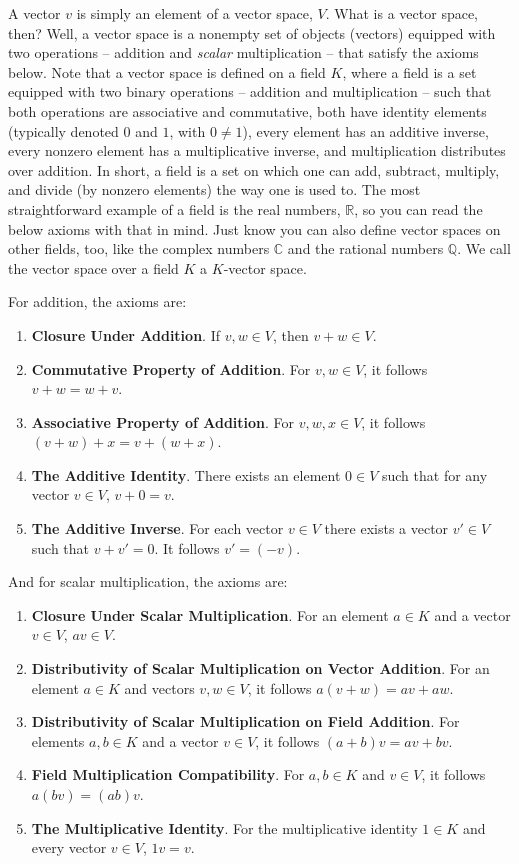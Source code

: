 \documentclass{article}
\begin{document}
A vector $v$ is simply an element of a vector space, $V$. What is a vector space, then? Well, a vector space is a nonempty set of objects (vectors) equipped with two operations -- addition and \textit{scalar} multiplication -- that satisfy the axioms below. Note that a vector space is defined on a field $K$, where a field is a set equipped with two binary operations -- addition and multiplication -- such that both operations are associative and commutative, both have identity elements (typically denoted $0$ and $1$, with $0 \neq 1$), every element has an additive inverse, every nonzero element has a multiplicative inverse, and multiplication distributes over addition. In short, a field is a set on which one can add, subtract, multiply, and divide (by nonzero elements) the way one is used to. The most straightforward example of a field is the real numbers, $\mathbb{R}$, so you can read the below axioms with that in mind. Just know you can also define vector spaces on other fields, too, like the complex numbers $\mathbb{C}$ and the rational numbers $\mathbb{Q}$. We call the vector space over a field $K$ a $K$-vector space.

For addition, the axioms are:

\begin{enumerate}
    \item \textbf{Closure Under Addition}. If $v, w \in V$, then $v+w \in V$.
    \item \textbf{Commutative Property of Addition}. For $v,w \in V$, it follows $v+w=w+v$.
    \item \textbf{Associative Property of Addition}. For $v,w,x \in V$, it follows $(v+w)+x=v+(w+x)$.
    \item \textbf{The Additive Identity}. There exists an element $0 \in V$ such that for any vector $v \in V$, $v+0=v$.
    \item \textbf{The Additive Inverse}. For each vector $v \in V$ there exists a vector $v' \in V$ such that $v + v' = 0$. It follows $v' = (-v)$.
\end{enumerate}

And for scalar multiplication, the axioms are:

\begin{enumerate}
    \item \textbf{Closure Under Scalar Multiplication}. For an element $a \in K$ and a vector $v \in V$, $av \in V$.
    \item \textbf{Distributivity of Scalar Multiplication on Vector Addition}. For an element $a \in K$ and vectors $v,w \in V$, it follows $a(v+w)=av+aw$.
    \item \textbf{Distributivity of Scalar Multiplication on Field Addition}. For elements $a,b \in K$ and a vector $v \in V$, it follows $(a+b)v=av+bv$.
    \item \textbf{Field Multiplication Compatibility}. For $a,b \in K$ and $v \in V$, it follows $a(bv)=(ab)v$.
    \item \textbf{The Multiplicative Identity}. For the multiplicative identity $1 \in K$ and every vector $v \in V$, $1v=v$.
\end{enumerate}
\end{document}

